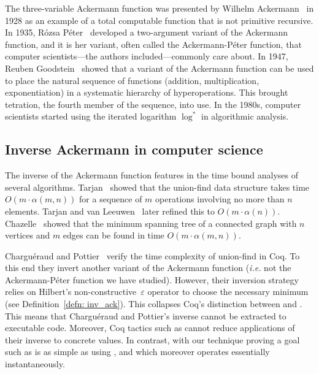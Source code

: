 The three-variable Ackermann function was presented by Wilhelm Ackermann~\cite{ackermann} in 1928 as an example of a total computable function that is not primitive recursive.
In 1935, Rózsa Péter~\cite{peter} developed a two-argument variant of the Ackermann 
function, and it is her variant, often called the Ackermann-Péter function,
that computer scientists---the authors included---commonly care about.
In 1947, Reuben Goodstein~\cite{goodstein} showed that a variant of the Ackermann function 
can be used to place the natural sequence of functions (addition, multiplication,
exponentiation) in a systematic hierarchy of hyperoperations. 
This brought tetration, the fourth member of the sequence, into use.
In the 1980s, computer scientists started using the
iterated logarithm $\log^*$ in algorithmic analysis.

\subsection{Inverse Ackermann in computer science}

The inverse of the Ackermann function
features in the time bound analyses of several algorithms.
Tarjan~\cite{tarjan} showed that the union-find data structure
takes time \mbox{$O(m\cdot\alpha(m,n))$} for a sequence of $m$ operations
involving no more than $n$ elements.
Tarjan and van Leeuwen~\cite{tarjan2} later refined this to $O(m\cdot\alpha(n))$.
Chazelle~\cite{chazelle} showed that the minimum spanning tree
of a connected graph with $n$ vertices and $m$ edges
can be found in time $O(m\cdot\alpha(m,n))$.

Chargu\'eraud and Pottier~\cite{charpott}
verify the time complexity of union-find in Coq.
To this end they invert another variant of the Ackermann function 
(\emph{i.e.} not the Ackermann-Péter function we have 
studied). 
However, their inversion strategy 
relies on Hilbert's non-constructive~$\varepsilon$ operator 
to choose the necessary minimum (see Definition~\ref{defn: inv_ack}). 
This collapses Coq's distinction between  and .
This means that Chargu\'eraud and Pottier's 
inverse cannot be extracted to executable code.  Moreover, 
Coq tactics such as  cannot reduce applications of
their inverse to concrete values.  In contrast, with our technique
proving a goal such as  is as simple as using , and which moreover operates essentially instantaneously.

